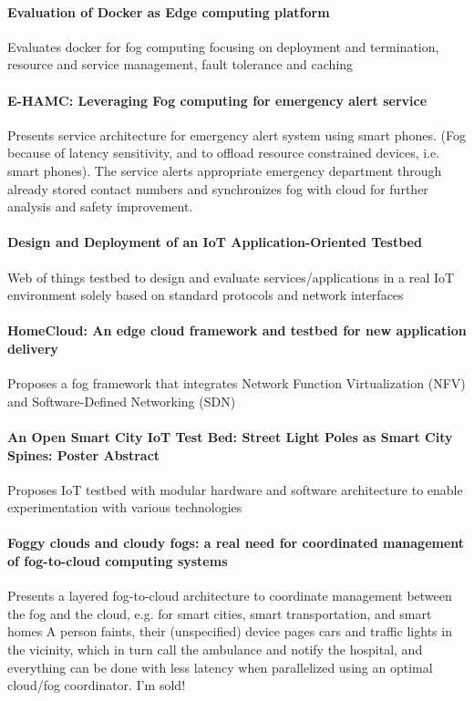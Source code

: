\paragraph{Evaluation of Docker as Edge computing platform}\cite{ismail_evaluation_2015}
Evaluates docker for fog computing focusing on deployment and termination, resource and service management, fault tolerance and caching

\paragraph{E-HAMC: Leveraging Fog computing for emergency alert service} \cite{7134091}
Presents service architecture for emergency alert system using smart phones. (Fog because of latency sensitivity, and to offload resource constrained devices, i.e. smart phones). The service alerts appropriate emergency department through already stored contact numbers and synchronizes fog with cloud for further analysis and safety improvement.

\paragraph{Design and Deployment of an IoT Application-Oriented Testbed}\cite{belli_design_2015}
Web of things testbed to design and evaluate services/applications in a real IoT environment solely based on standard protocols and network interfaces

\paragraph{HomeCloud: An edge cloud framework and testbed for new application delivery} \cite{pan_homecloud:_2016}
Proposes a fog framework that integrates Network Function Virtualization (NFV) and Software-Defined Networking (SDN)

\paragraph{An Open Smart City IoT Test Bed: Street Light Poles as Smart City Spines: Poster Abstract}\cite{amrutur_open_2017}
Proposes IoT testbed with modular hardware and software architecture to enable experimentation with various technologies

\paragraph{Foggy clouds and cloudy fogs: a real need for coordinated management of fog-to-cloud computing systems}\cite{masip-bruin_foggy_2016}
Presents a layered fog-to-cloud architecture to coordinate management between the fog and the cloud, e.g. for smart cities, smart transportation, and smart homes
A person faints, their (unspecified) device pages cars and traffic lights in the vicinity,
which in turn call the ambulance and notify the hospital, and everything can be done with
less latency when parallelized using an optimal cloud/fog coordinator. I'm sold!

